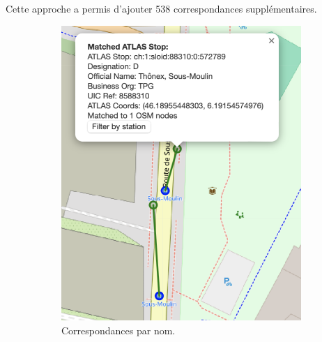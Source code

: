 Cette approche a permis d'ajouter 538 correspondances supplémentaires.
\begin{figure}[h]
    \centering
    \begin{subfigure}[b]{0.4\textwidth}
        \centering
        \includegraphics[width=\textwidth]{../figures/correspondances/name_app.png}
        \caption[Correspondances par nom]{Correspondances par nom.}
        \label{fig:name_app}
    \end{subfigure}
    \hspace{-0.2cm}  %
    \begin{subfigure}[b]{0.45\textwidth}
        \centering

\end{subfigure}
\end{figure}
